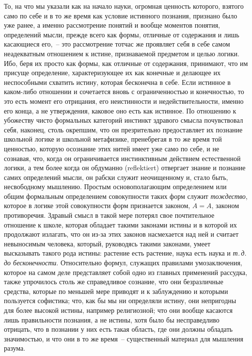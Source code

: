 То, на что мы указали как на начало науки, огромная
ценность которого, взятого само по себе и в то же время
как условие истинного познания, признано было уже ранее,
а именно рассмотрение понятий и вообще моментов
понятия, определений мысли, прежде всего как формы,
отличные от содержания и лишь касающиеся его,~-- это
рассмотрение тотчас же проявляет себя в себе самом
неадекватным отношением к истине, признаваемой предметом
и целью логики. Ибо, беря их просто как формы,
как отличные от содержания, принимают, что им присуще
определение, характеризующее их как конечные и делающее
их неспособными схватить истину, которая бесконечна
в себе. Если истинное в каком-либо отношении и
сочетается вновь с ограниченностью и конечностью, то
это есть момент его отрицания, его неистинности и недействительности,
именно его конца, а не утверждения, каковое
оно есть как истинное. По отношению к убожеству
чисто формальных категорий инстинкт здравого смысла
почувствовал себя, наконец, столь окрепшим, что он презрительно
предоставляет их познание школьной логике
и школьной метафизике, пренебрегая в то же время той
ценностью, которую осознание этих нитей имеет уже
само по себе, и не сознавая, что, когда он ограничивается
инстинктивным действием естественной логики, а тем
более когда он обдуманно (reflektiert) отвергает знание и
познание самих определений мысли, он рабски служит
неочищенному и, стало быть, несвободному мышлению.
Простым основополагающим определением или общим
формальным определением совокупности таких форм служит
\emph{тождество}, которое в логике этой совокупности форм
признается законом, $A = A$, законом противоречия. Здравый
смысл в такой мере потерял свое почтительное отношение
к школе, которая обладает такими законами истины
и в которой их продолжают излагать, что он из-за
этих законов насмехается над ней и считает невыносимым
человека, который, руководясь такими законами,
умеет высказывать такого рода истины: растение есть
растение, наука есть наука и \emph{т.\,д. до бесконечности}.
Относительно формул, служащих правилами умозаключения,
которое на самом деле представляет собой одно из
главных применений рассудка, также упрочилось столь
же справедливое сознание, что они безразличные средства,
которые по меньшей мере приводят и к заблуждению
и которыми пользуется софистика; что, как бы мы ни
определяли истину, они непригодны для более высокой
истины, например религиозной; что они вообще касаются
лишь правильности познания, а не истины, хотя было бы
несправедливо отрицать, что в познании у них есть такая
область, где они должны обладать значимостью, и что
они в то же время~-- существенный материал для мышления
разума.

